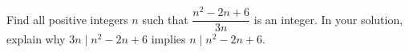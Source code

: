 Find all positive integers $n$ such that $\dfrac{n^2-2n+6}{3n}$ is an integer. In your solution, explain why $3n\mid n^2-2n+6$ implies $n\mid n^2-2n+6$.
